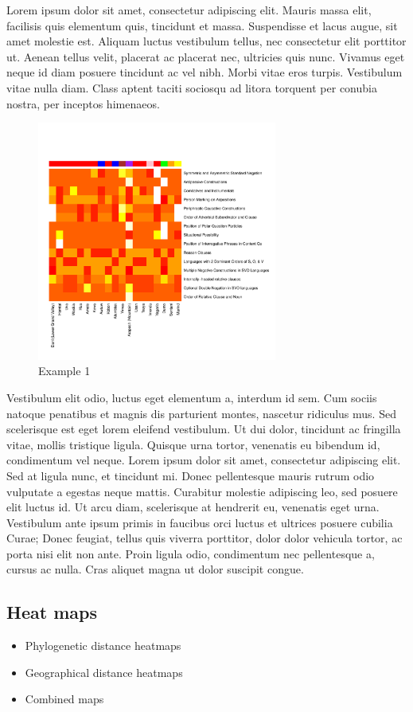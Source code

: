 \documentclass[11pt]{article}
\begin{document}
Lorem ipsum dolor sit amet, consectetur adipiscing elit. Mauris massa elit, facilisis quis elementum quis, tincidunt et massa. Suspendisse et lacus augue, sit amet molestie est. Aliquam luctus vestibulum tellus, nec consectetur elit porttitor ut. Aenean tellus velit, placerat ac placerat nec, ultricies quis nunc. Vivamus eget neque id diam posuere tincidunt ac vel nibh. Morbi vitae eros turpis. Vestibulum vitae nulla diam. Class aptent taciti sociosqu ad litora torquent per conubia nostra, per inceptos himenaeos.
\begin{figure}[h]
\includegraphics[width=3.1in]
{graph2.pdf} 
\caption{Example 1} 
\label{fig:sparse} 
\end{figure}
Vestibulum elit odio, luctus eget elementum a, interdum id sem. Cum sociis natoque penatibus et magnis dis parturient montes, nascetur ridiculus mus. Sed scelerisque est eget lorem eleifend vestibulum. Ut dui dolor, tincidunt ac fringilla vitae, mollis tristique ligula. Quisque urna tortor, venenatis eu bibendum id, condimentum vel neque. Lorem ipsum dolor sit amet, consectetur adipiscing elit. Sed at ligula nunc, et tincidunt mi. Donec pellentesque mauris rutrum odio vulputate a egestas neque mattis. Curabitur molestie adipiscing leo, sed posuere elit luctus id. Ut arcu diam, scelerisque at hendrerit eu, venenatis eget urna. Vestibulum ante ipsum primis in faucibus orci luctus et ultrices posuere cubilia Curae; Donec feugiat, tellus quis viverra porttitor, dolor dolor vehicula tortor, ac porta nisi elit non ante. Proin ligula odio, condimentum nec pellentesque a, cursus ac nulla. Cras aliquet magna ut dolor suscipit congue.

\subsection{Heat maps}
\begin{itemize}
\item Phylogenetic distance heatmaps
\item Geographical distance heatmaps
\item Combined maps
\end{itemize}
\end{document}
